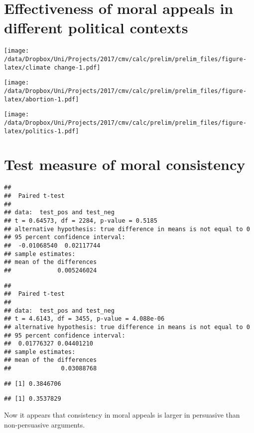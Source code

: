 \clearpage

\section{Effectiveness of moral appeals in different political
contexts}\label{effectiveness-of-moral-appeals-in-different-political-contexts}

\texttt{[image: /data/Dropbox/Uni/Projects/2017/cmv/calc/prelim/prelim\_files/figure-latex/climate change-1.pdf]}

\texttt{[image: /data/Dropbox/Uni/Projects/2017/cmv/calc/prelim/prelim\_files/figure-latex/abortion-1.pdf]}

\texttt{[image: /data/Dropbox/Uni/Projects/2017/cmv/calc/prelim/prelim\_files/figure-latex/politics-1.pdf]}

\clearpage

\section{Test measure of moral
consistency}\label{test-measure-of-moral-consistency}

\begin{verbatim}
## 
##  Paired t-test
## 
## data:  test_pos and test_neg
## t = 0.64573, df = 2284, p-value = 0.5185
## alternative hypothesis: true difference in means is not equal to 0
## 95 percent confidence interval:
##  -0.01068540  0.02117744
## sample estimates:
## mean of the differences 
##             0.005246024
\end{verbatim}

\begin{verbatim}
## 
##  Paired t-test
## 
## data:  test_pos and test_neg
## t = 4.6143, df = 3455, p-value = 4.088e-06
## alternative hypothesis: true difference in means is not equal to 0
## 95 percent confidence interval:
##  0.01776327 0.04401210
## sample estimates:
## mean of the differences 
##              0.03088768
\end{verbatim}

\begin{verbatim}
## [1] 0.3846706
\end{verbatim}

\begin{verbatim}
## [1] 0.3537829
\end{verbatim}

Now it appears that consistency in moral appeals is larger in persuasive
than non-persuasive arguments.

\clearpage

